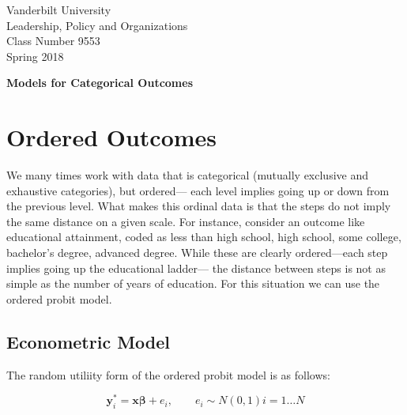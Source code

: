 \documentclass[12 pt]{article}
\begin{document}
\newcommand{\boldbeta}{\boldsymbol{\beta}}
\newcommand{\boldy}{\boldsymbol{y}}
\newcommand{\boldX}{\boldsymbol{X}}
\newcommand{\boldx}{\boldsymbol{x}}
\newcommand{\boldz}{\boldsymbol{z}}
\newcommand{\boldgamma}{\boldsymbol{\gamma}}
\newcommand{\boldeps}{\boldsymbol{\epsilon}}


\setlength{\parskip}{1ex plus 0.5ex minus 0.2ex}

\setcounter{secnumdepth}{-2}


\begin{flushleft}
  

Vanderbilt University \\
Leadership, Policy and Organizations \\
Class Number 9553 \\
Spring 2018 \\
\end{flushleft}

\begin{centering}
\textbf{\large{Models for Categorical Outcomes}}  
\end{centering}


\section{Ordered Outcomes}

We many times work with data that is categorical (mutually exclusive and exhaustive
categories), but ordered--- each level implies going up or down from the previous level.
What makes this ordinal data is that the steps do not imply the same distance on a
given scale. For instance, consider an outcome like educational attainment, coded as
less than high school, high school, some college, bachelor's degree, advanced degree.
While these are clearly ordered---each step implies going up the educational ladder---
the distance between steps is not as simple as the number of years of education.
For this situation we can use the ordered probit model. 


\subsection{Econometric Model}
\label{sec:econometric-model}

The random  utiliity form of the ordered probit model is as follows:

\begin{equation*}
  \boldy^*_i=\boldx \boldbeta + e_i, \qquad e_i  \sim N (0,1)   i=1  \ldots N
\end{equation*}
\end{document}
